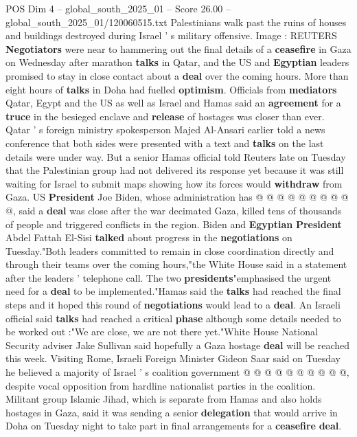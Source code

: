 \begin{textsample}{POS Dim 4 – global\_south\_2025\_01 – Score 26.00 – global\_south\_2025\_01/120060515.txt}  \label{ex:f4_pos_014}
Palestinians walk past the ruins of houses and buildings destroyed during Israel ' s military offensive.
Image : REUTERS \textbf{Negotiators} were near to hammering out the final details of a \textbf{ceasefire} in Gaza on Wednesday after marathon \textbf{talks} in Qatar, and the US and \textbf{Egyptian} leaders promised to stay in close contact about a \textbf{deal} over the coming hours.
More than eight hours of \textbf{talks} in Doha had fuelled \textbf{optimism}.
Officials from \textbf{mediators} Qatar, Egypt and the US as well as Israel and Hamas said an \textbf{agreement} for a \textbf{truce} in the besieged enclave and \textbf{release} of hostages was closer than ever.
Qatar ' s foreign ministry spokesperson Majed Al-Ansari earlier told a news conference that both sides were presented with a text and \textbf{talks} on the last details were under way.
But a senior Hamas official told Reuters late on Tuesday that the Palestinian group had not delivered its response yet because it was still waiting for Israel to submit maps showing how its forces would \textbf{withdraw} from Gaza.
US \textbf{President} Joe Biden, whose administration has @ @ @ @ @ @ @ @ @ @, said a \textbf{deal} was close after the war decimated Gaza, killed tens of thousands of people and triggered conflicts in the region.
Biden and \textbf{Egyptian} \textbf{President} Abdel Fattah El-Sisi \textbf{talked} about progress in the \textbf{negotiations} on Tuesday."Both leaders committed to remain in close coordination directly and through their teams over the coming hours,"the White House said in a statement after the leaders ' telephone call.
The two \textbf{presidents}"emphasised the urgent need for a \textbf{deal} to be implemented."Hamas said the \textbf{talks} had reached the final steps and it hoped this round of \textbf{negotiations} would lead to a \textbf{deal}.
An Israeli official said \textbf{talks} had reached a critical \textbf{phase} although some details needed to be worked out :"We are close, we are not there yet."White House National Security adviser Jake Sullivan said hopefully a Gaza hostage \textbf{deal} will be reached this week.
Visiting Rome, Israeli Foreign Minister Gideon Saar said on Tuesday he believed a majority of Israel ' s coalition government @ @ @ @ @ @ @ @ @ @, despite vocal opposition from hardline nationalist parties in the coalition.
Militant group Islamic Jihad, which is separate from Hamas and also holds hostages in Gaza, said it was sending a senior \textbf{delegation} that would arrive in Doha on Tuesday night to take part in final arrangements for a \textbf{ceasefire} \textbf{deal}.

\end{textsample}
